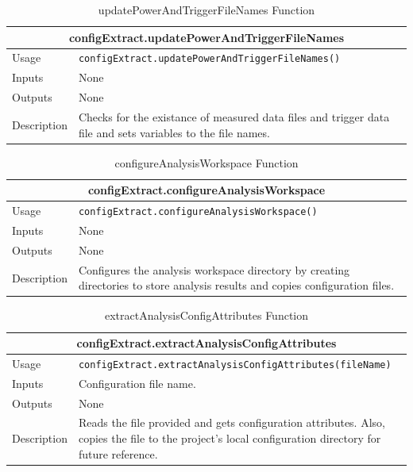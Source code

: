 \documentclass{llncs}
\numberwithin{algorithm}{chapter}
\begin{document}
\begin{table}[H]
\caption{updatePowerAndTriggerFileNames Function}
\begin{tabular}{ |p{2cm}||p{11cm}|  }
 \hline
 \multicolumn{2}{|c|}{\cellcolor{teal}\textbf{configExtract.updatePowerAndTriggerFileNames}} \\
 \hline
 Usage & \texttt{configExtract.updatePowerAndTriggerFileNames()}\\ \hline
 Inputs & None \\ \hline
 Outputs &  None \\ \hline
 Description & Checks for the existance of measured data files and trigger data file and sets variables to the file names.  \\ \hline
\end{tabular}
\end{table}

\begin{table}[H]
\caption{configureAnalysisWorkspace Function}
\begin{tabular}{ |p{2cm}||p{11cm}|  }
 \hline
 \multicolumn{2}{|c|}{\cellcolor{teal}\textbf{configExtract.configureAnalysisWorkspace}} \\
 \hline
 Usage & \texttt{configExtract.configureAnalysisWorkspace()}\\ \hline
 Inputs & None \\ \hline
 Outputs &  None \\ \hline
 Description & Configures the analysis workspace directory by creating directories to store analysis results and copies configuration files. \\ \hline
\end{tabular}
\end{table}

\begin{table}[H]
\caption{extractAnalysisConfigAttributes Function}
\begin{tabular}{ |p{2cm}||p{11cm}|  }
 \hline
 \multicolumn{2}{|c|}{\cellcolor{teal}\textbf{configExtract.extractAnalysisConfigAttributes}} \\
 \hline
 Usage & \texttt{configExtract.extractAnalysisConfigAttributes(fileName)}\\ \hline
 Inputs & Configuration file name. \\ \hline
 Outputs &  None \\ \hline
 Description & Reads the file provided and gets configuration attributes. Also, copies the file to the project’s local configuration directory for future reference. \\ \hline
\end{tabular}
\end{table}
\end{document}
